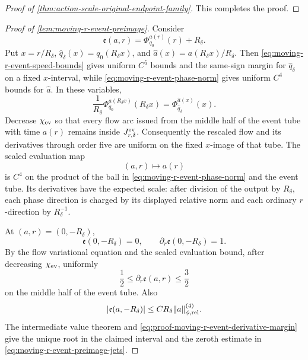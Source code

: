 \begin{proof}[Proof of
\cref{thm:action-scale-original-endpoint-family}]
This completes the proof.
\end{proof}

\begin{proof}[Proof of \cref{lem:moving-r-event-preimage}]
Consider
\begin{equation}
 \mathfrak e(a,r)=\Phi_{q_0}^{a(r)}(r)+R_\delta.             \label{eq:proof-moving-r-event-function}
\end{equation}
Put \(x=r/R_\delta\),
\(\widehat q_\delta(x)=q_0(R_\delta x)\), and
\(\widehat a(x)=a(R_\delta x)/R_\delta\).  Then
\cref{eq:moving-r-event-speed-bounds} gives uniform \(C^5\) bounds and the
same-sign margin for \(\widehat q_\delta\) on a fixed \(x\)-interval, while
\cref{eq:moving-r-event-phase-norm} gives uniform \(C^4\) bounds for
\(\widehat a\).  In these variables,
\begin{equation}
 \frac{1}{R_\delta}\Phi_{q_0}^{a(R_\delta x)}(R_\delta x)
 =\Phi_{\widehat q_\delta}^{\widehat a(x)}(x).              \label{eq:proof-moving-r-rescaled-flow}
\end{equation}
Decrease \(\chi_{\rm ev}\) so that every flow arc issued from the middle
half of the event tube with time \(a(r)\) remains inside
\(J_{r,\delta}^{\rm ev}\).  Consequently the rescaled flow and its
derivatives through order five are uniform on the fixed \(x\)-image of
that tube.  The scaled evaluation map
\begin{equation}
 (a,r)\longmapsto a(r)                           \label{eq:proof-moving-r-scaled-evaluation}
\end{equation}
is \(C^4\) on the product of the ball in
\cref{eq:moving-r-event-phase-norm} and the event tube.  Its derivatives
have the expected scale: after division of the output by \(R_\delta\),
each phase direction is charged by its displayed relative norm and each
ordinary \(r\)-direction by \(R_\delta^{-1}\).

At \((a,r)=(0,-R_\delta)\),
\begin{equation}
 \mathfrak e(0,-R_\delta)=0,
 \qquad
 \partial_r\mathfrak e(0,-R_\delta)=1.          \label{eq:proof-moving-r-event-base-margin}
\end{equation}
By the flow variational equation and the scaled evaluation bound, after
decreasing \(\chi_{\rm ev}\), uniformly
\begin{equation}
 \frac12\le\partial_r\mathfrak e(a,r)\le\frac32             \label{eq:proof-moving-r-event-derivative-margin}
\end{equation}
on the middle half of the event tube.  Also
\begin{equation}
 |\mathfrak e(a,-R_\delta)|
 \le C R_\delta\|a\|_{\phi,\rm rel}^{(4)}.       \label{eq:proof-moving-r-event-base-defect}
\end{equation}
The intermediate value theorem and
\cref{eq:proof-moving-r-event-derivative-margin} give the unique root in
the claimed interval and the zeroth estimate in
\cref{eq:moving-r-event-preimage-jets}.


\end{proof}
